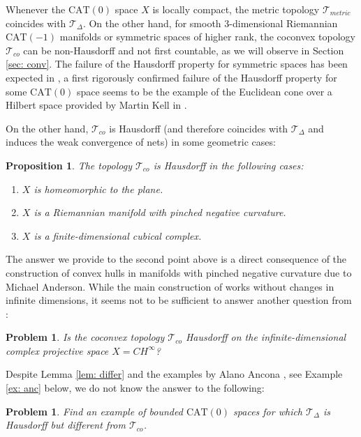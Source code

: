 \documentclass[12pt,leqno]{amsart}
\numberwithin{equation}{section}
\newtheorem{prop}[thm]{Proposition}
\newtheorem{quest}[thm]{Problem}
\theoremstyle{remark}
\newcommand{\CAT}{\mathrm{CAT}}
\begin{document}
Whenever the $\CAT(0)$ space $X$ is locally compact, the metric topology $\mathcal T_{metric}$ coincides with $\mathcal T_{\Delta}$.
On the other hand, for smooth 3-dimensional Riemannian $\CAT(-1)$ manifolds or symmetric spaces of higher rank, the coconvex topology $\mathcal T_{co}$ can be non-Hausdorff and not first countable, as we will observe in Section \ref{sec: conv}.
The failure of the Hausdorff property for symmetric spaces has been expected in \cite{Monod}, a first rigorously confirmed failure
of the Hausdorff property for some $\CAT(0)$ space seems to be the example of the Euclidean cone over a Hilbert space provided by Martin Kell in \cite{Kell}.

On the other hand,
$\mathcal T_{co}$ is Hausdorff (and therefore coincides with $\mathcal T_{\Delta}$ and induces the weak convergence of nets) in some geometric cases:

\begin{prop} \label{prop: cohaus}
The topology $\mathcal T_{co}$ is Hausdorff in the following cases:
\begin{enumerate}
\item $X$ is homeomorphic to the plane.
\item $X$ is a Riemannian manifold with pinched negative curvature. 
\item $X$ is a finite-dimensional cubical complex.
\end{enumerate}
\end{prop}


The answer we provide to the second point above is a direct consequence of the construction of convex hulls in manifolds with pinched negative curvature due to Michael Anderson. While the main construction of \cite{Anderson} works without changes in infinite dimensions,
it seems not to be sufficient to answer another question from \cite{Monod}:

\begin{quest}
Is the coconvex topology $\mathcal T_{co}$ Hausdorff on the infinite-dimensional complex projective space $X=CH^{\infty}$? 
\end{quest}

Despite Lemma \ref{lem: differ} and the examples by Alano Ancona \cite{Ancona}, see Example \ref{ex: anc} below,
we do not know the answer to the following:

\begin{quest}
Find an example of bounded $\CAT(0)$ spaces for which $\mathcal T_{\Delta}$ is Hausdorff but different from $\mathcal T_{co}$. 
\end{quest}
\end{document}
